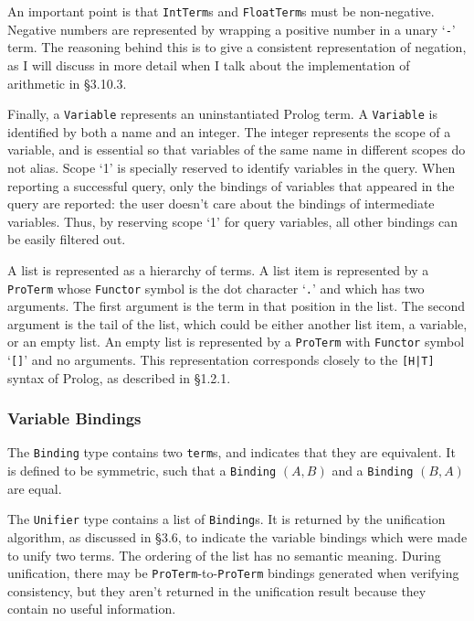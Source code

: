 \documentclass[12pt]{article}
\begin{document}
An important point is that \verb|IntTerm|s and \verb|FloatTerm|s must be non-negative. 
Negative numbers are represented by wrapping a positive number in a unary `\verb|-|' term. 
The reasoning behind this is to give a consistent representation of negation, as I will discuss in more detail when I talk about the implementation of arithmetic in \S3.10.3.

Finally, a \verb|Variable| represents an uninstantiated Prolog term. 
A \verb|Variable| is identified by both a name and an integer. 
The integer represents the scope of a variable, and is essential so that variables of the same name in different scopes do not alias. 
Scope `1' is specially reserved to identify variables in the query. 
When reporting a successful query, only the bindings of variables that appeared in the query are reported: the user doesn't care about the bindings of intermediate variables.
Thus, by reserving scope `1' for query variables, all other bindings can be easily filtered out.

A list is represented as a hierarchy of terms. 
A list item is represented by a \verb|ProTerm| whose \verb|Functor| symbol is the dot character `\verb|.|' and which has two arguments. 
The first argument is the term in that position in the list. 
The second argument is the tail of the list, which could be either another list item, a variable, or an empty list.
An empty list is represented by a \verb|ProTerm| with \verb|Functor| symbol `\verb|[]|' and no arguments. 
This representation corresponds closely to the \verb/[H|T]/ syntax of Prolog, as described in \S1.2.1.

\subsubsection{Variable Bindings}

The \verb|Binding| type contains two \verb|term|s, and indicates that they are equivalent. 
It is defined to be symmetric, such that a \verb|Binding| $(A,B)$ and a \verb|Binding| $(B,A)$ are equal.

The \verb|Unifier| type contains a list of \verb|Binding|s. 
It is returned by the unification algorithm, as discussed in \S3.6, to indicate the variable bindings which were made to unify two terms. 
The ordering of the list has no semantic meaning.
During unification, there may be \verb|ProTerm|-to-\verb|ProTerm| bindings generated when verifying consistency, but they aren't returned in the unification result because they contain no useful information.
\end{document}

